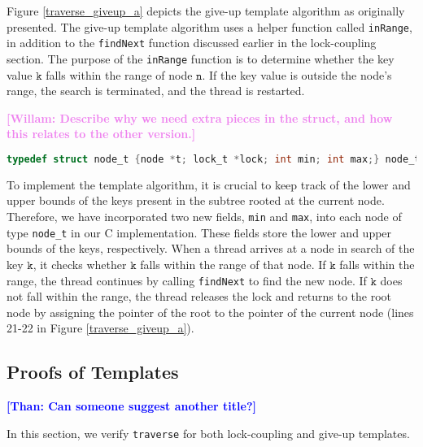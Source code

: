 \documentclass[a4paper,UKenglish,cleveref, autoref, thm-restate]{lipics-v2021}
\newcommand{\than}[1]{\textbf{\textcolor{blue}{[Than: #1]}}}
\newcommand{\wm}[1]{\textbf{\textcolor{violet}{[Willam: #1]}}}
\begin{document}
Figure \ref{traverse_giveup_a} depicts the give-up template algorithm as originally presented. The give-up template algorithm uses a helper function called \lstinline{inRange}, in addition to the \lstinline{findNext} function discussed earlier in the lock-coupling section. The purpose of the \lstinline{inRange} function is to determine whether the key value $\texttt{k}$ falls within the range of node $\texttt{n}$. If the key value is outside the node's range, the search is terminated, and the thread is restarted.

\wm{Describe why we need extra pieces in the struct, and how this relates to the other version.}
\begin{lstlisting}[language = C, backgroundcolor=\color{white}, basicstyle=\ttfamily\footnotesize]
	typedef struct node_t {node *t; lock_t *lock; int min; int max;} node_t;
\end{lstlisting}

To implement the template algorithm, it is crucial to keep track of the lower and upper bounds of the keys present in the subtree rooted at the current node. Therefore, we have incorporated two new fields, \lstinline{min} and \lstinline{max}, into each node of type \lstinline{node_t} in our C implementation. These fields store the lower and upper bounds of the keys, respectively. When a thread arrives at a node in search of the key $\texttt{k}$, it checks whether $\texttt{k}$ falls within the range of that node. If $\texttt{k}$ falls within the range, the thread continues by calling \lstinline{findNext} to find the new node. If $\texttt{k}$ does not fall within the range, the thread releases the lock and returns to the root node by assigning the pointer of the root to the pointer of the current node (lines 21-22 in Figure \ref{traverse_giveup_a}).

\subsection{Proofs of Templates} \than{Can someone suggest another title?}

In this section, we verify \lstinline{traverse} for both lock-coupling and give-up templates.  
\end{document}
